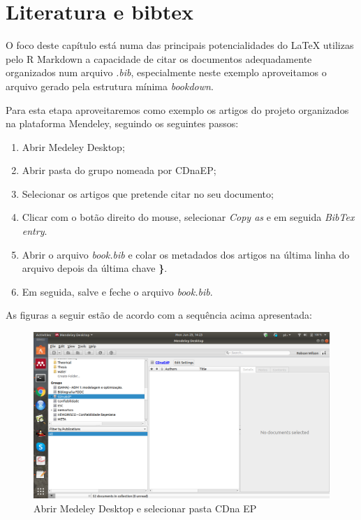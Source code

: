 \documentclass[]{book}
\providecommand{\tightlist}{%
  \setlength{\itemsep}{0pt}\setlength{\parskip}{0pt}}
\begin{document}
\chapter{Literatura e bibtex}\label{literatura-e-bibtex}

O foco deste capítulo está numa das principais potencialidades do LaTeX
utilizas pelo R Markdown a capacidade de citar os documentos
adequadamente organizados num arquivo \emph{.bib}, especialmente neste
exemplo aproveitamos o arquivo gerado pela estrutura mínima
\emph{bookdown}.

Para esta etapa aproveitaremos como exemplo os artigos do projeto
organizados na plataforma Mendeley, seguindo os seguintes passos:

\begin{enumerate}
\def\labelenumi{\arabic{enumi}.}
\tightlist
\item
  Abrir Medeley Desktop;
\item
  Abrir pasta do grupo nomeada por CDnaEP;
\item
  Selecionar os artigos que pretende citar no seu documento;
\item
  Clicar com o botão direito do mouse, selecionar \emph{Copy as} e em
  seguida \emph{BibTex entry}.
\item
  Abrir o arquivo \emph{book.bib} e colar os metadados dos artigos na
  última linha do arquivo depois da última chave \textbf{\}}.
\item
  Em seguida, salve e feche o arquivo \emph{book.bib}.
\end{enumerate}

As figuras a seguir estão de acordo com a sequência acima apresentada:

\begin{figure}
\centering
\includegraphics{fig/open_mendeley.png}
\caption{Abrir Medeley Desktop e selecionar pasta CDna EP}
\end{figure}
\end{document}
